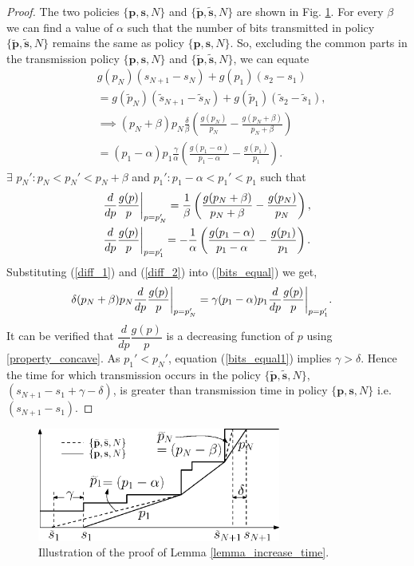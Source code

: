 \begin{proof}
The two policies $\{\textbf{p},\textbf{s},N\}$  and $\{\bm{\widetilde{p}},\bm{\widetilde{s}},N\}$ are shown in Fig. \ref{lemma4}. For every $\beta$ we can find a value of $\alpha$ such that the number of bits transmitted in policy $\{\bm{\widetilde{p}},\bm{\widetilde{s}},N\}$ remains the same as policy $\{\textbf{p},\textbf{s},N\}$. So, excluding the common parts in the transmission policy $\{\textbf{p},\textbf{s},N\}$ and $\{\bm{\widetilde{p}},\bm{\widetilde{s}},N\}$, we can equate
\begin{align}
&g(p_N)(s_{N+1}-s_N)+g(p_1)(s_2-s_1)\nonumber
\\
&=g(\widetilde{p}_N)(\widetilde{s}_{N+1}-\widetilde{s}_N)+g(\widetilde{p}_1)(\widetilde{s}_2-\widetilde{s}_1)\nonumber,
\\
&\implies (p_N+\beta)p_N\frac{\delta}{\beta}\left(\frac{g(p_N)}{p_N}-\frac{g(p_N+\beta)}{p_N+\beta}\right)\nonumber
\\
&=(p_1-\alpha)p_1\frac{\gamma}{\alpha}\left(\frac{g(p_1-\alpha)}{p_1-\alpha}-\frac{g(p_1)}{p_1}\right).\label{bits_equal}
\end{align}
$\exists$ $p_N':p_N<p_N'<p_{N}+\beta$ and $p_1':p_1-\alpha<p_1'<p_{1}$ such that
\begin{align}
&\frac{d}{dp} \frac{g(p)}{p} \bigg{\vert}_{p=p_N'}=\frac{1}{\beta}\left(\frac{g(p_N+\beta)}{p_N+\beta}-\frac{g(p_N)}{p_N}\right),\label{diff_1}
\\
&\frac{d}{dp} \frac{g(p)}{p}\bigg{\vert}_{p=p_1'}=-\frac{1}{\alpha}\left(\frac{g(p_1-\alpha)}{p_1-\alpha}-\frac{g(p_1)}{p_1}\right)\label{diff_2}.
\end{align}
Substituting (\ref{diff_1}) and (\ref{diff_2}) into (\ref{bits_equal}) we get,
\begin{align}
&\delta(p_N+\beta)p_N\frac{d}{dp} \frac{g(p)}{p}  \bigg{\vert}_{p=p_N'}
=\gamma(p_1-\alpha)p_1\frac{d}{dp} \frac{g(p)}{p} \bigg{\vert}_{p=p_1'}.\label{bits_equal1}
\end{align}
It can be verified that $\dfrac{d}{dp} \dfrac{g(p)}{p}$ is a decreasing function of $p$ using \eqref{property_concave}. As $p_1'<p_N'$, equation (\ref{bits_equal1}) implies $\gamma >\delta$. Hence the time for which transmission occurs in the policy $\{\bm{\widetilde{p}},\bm{\widetilde{s}},N\}$, $\left( s_{N+1}-s_1+\gamma-\delta\right)$, is greater than transmission time in policy $\{\textbf{p},\textbf{s},N\}$ i.e. $(s_{N+1}-s_1)$.
\end{proof}
\begin{figure}
\centering
  \centerline{\includegraphics[width=8cm]{Lemma4.eps}}
\caption{Illustration of the proof of Lemma \ref{lemma_increase_time}.}\label{lemma4}
\end{figure}

